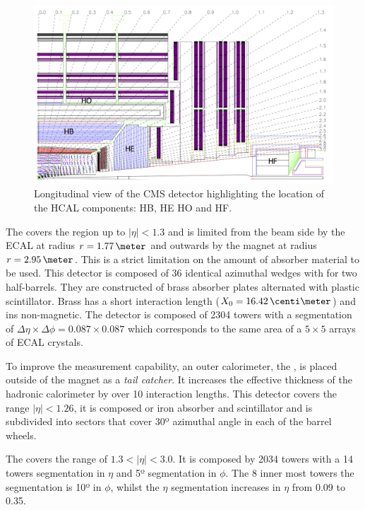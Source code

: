 \begin{figure}[!htb]
  \centering
  \includegraphics[width=1.0\textwidth]{Chapter02/CMS/Images/CMS_HCAL_Layout.png}
  \caption{Longitudinal view of the CMS detector highlighting the location of the \gls{HCAL} components: \gls{HB}, \gls{HE} \gls{HO} and \gls{HF}.}
  \label{FIGURE:ExperimentalApparatus_CMS_HCAL_Layout}
\end{figure}

The  covers the region up to $|\eta|<1.3$ and is limited from the beam side by the \gls{ECAL} at radius $r=1.77\,\meter$ and outwards by the magnet at radius $r=2.95\,\meter$. This is a strict limitation on the amount of absorber material to be used. This detector is composed of 36 identical azimuthal wedges with for two half-barrels. They are constructed of brass absorber plates alternated with plastic scintillator. Brass has a short interaction length ($X_0=16.42\,\centi\meter$) and ins non-magnetic. The detector is composed of 2304 towers with a segmentation of $\Delta\eta \times \Delta\phi = 0.087 \times 0.087$ which corresponds to the same area of a $5 \times 5$ arrays of \gls{ECAL} crystals.

To improve the measurement capability, an outer calorimeter, the , is placed outside of the magnet as a \textit{tail catcher}. It increases the effective thickness of the hadronic calorimeter by over 10 interaction lengths. This detector covers the range $|\eta|<1.26$, it is composed or iron absorber and scintillator and is subdivided into sectors that cover 30º azimuthal angle in each of the barrel wheels. 

The  covers the range of $1.3<|\eta|<3.0$. It is composed by 2034 towers with a 14 towers segmentation in $\eta$ and 5º segmentation in $\phi$. The 8 inner most towers the segmentation is 10º in $\phi$, whilst the $\eta$ segmentation increases in $\eta$ from 0.09 to 0.35.

